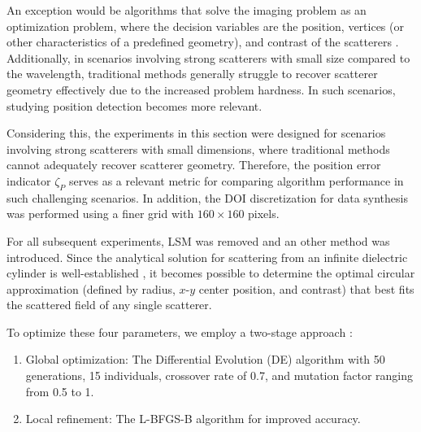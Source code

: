 \documentclass{IEEEtran}
\begin{document}
            An exception would be algorithms that solve the imaging problem as an optimization problem, where the decision variables are the position, vertices (or other characteristics of a predefined geometry), and contrast of the scatterers \cite{michalski2000electromagnetic,salucci2022learned,zardi2025physics}. Additionally, in scenarios involving strong scatterers with small size compared to the wavelength, traditional methods generally struggle to recover scatterer geometry effectively due to the increased problem hardness. In such scenarios, studying position detection becomes more relevant.


            Considering this, the experiments in this section were designed for scenarios involving strong scatterers with small dimensions, where traditional methods cannot adequately recover scatterer geometry. Therefore, the position error indicator $\zeta_P$ serves as a relevant metric for comparing algorithm performance in such challenging scenarios. In addition, the DOI discretization for data synthesis was performed using a finer grid with $160 \times 160$ pixels.

            For all subsequent experiments, LSM was removed and an other method was introduced. Since the analytical solution for scattering from an infinite dielectric cylinder is well-established \cite{harrington2001time}, it becomes possible to determine the optimal circular approximation (defined by radius, $x$-$y$ center position, and contrast) that best fits the scattered field of any single scatterer.

            To optimize these four parameters, we employ a two-stage approach \cite{virtanen2020SciPy}:
            \begin{enumerate}
                \item Global optimization: The Differential Evolution (DE) algorithm \cite{storn1997differential} with 50 generations, 15 individuals, crossover rate of 0.7, and mutation factor ranging from 0.5 to 1.
                \item Local refinement: The L-BFGS-B algorithm \cite{zhu1997algorithm} for improved accuracy.
            \end{enumerate}
\end{document}
